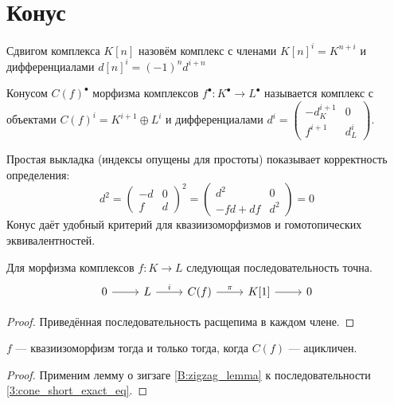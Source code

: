 \documentclass[../main.tex]{subfiles}
\begin{document}
\section{Конус}
\begin{to_def}
Сдвигом комплекса $K[n]$ назовём комплекс с членами $K[n]^i = K^{n+i}$ и дифференциалами $d[n]^i = (-1)^nd^{i+n}$
\end{to_def}
\begin{to_def}
Конусом $C(f)^\bullet$ морфизма комплексов $f^\bullet:K^\bullet\to L^\bullet$ называется комплекс с объектами $C(f)^i = K^{i+1}\oplus L^i$ и дифференциалами $d^i = \begin{pmatrix}-d_K^{i+1}&0\\f^{i+1}&d_L^i\end{pmatrix}$.
\end{to_def}
Простая выкладка (индексы опущены для простоты) показывает корректность определения:
\begin{equation*}
d^2 = \begin{pmatrix}-d&0\\f&d\end{pmatrix}^2 = \begin{pmatrix}d^2&0\\-fd + df&d^2\end{pmatrix} = 0
\end{equation*}
Конус даёт удобный критерий для квазиизоморфизмов и гомотопических эквивалентностей.
\begin{to_suj}\label{3:cone_short_exact}
Для морфизма комплексов $f:K\to L$ следующая последовательность точна.
\begin{equation}\label{3:cone_short_exact_eq}
    \begin{tikzcd}
	0 & L & {C(f)} & {K[1]} & 0
	\arrow[from=1-1, to=1-2]
	\arrow["i", from=1-2, to=1-3]
	\arrow["\pi", from=1-3, to=1-4]
	\arrow[from=1-4, to=1-5]
\end{tikzcd}
\end{equation}
\end{to_suj}
\begin{proof}
Приведённая последовательность расщепима в каждом члене.
\end{proof}
\begin{to_thr}
$f$ --- квазиизоморфизм тогда и только тогда, когда $C(f)$ --- ацикличен.
\end{to_thr}
\begin{proof}
    Применим лемму о зигзаге \ref{B:zigzag_lemma} к последовательности \eqref{3:cone_short_exact_eq}.
\end{proof}
\end{document}

